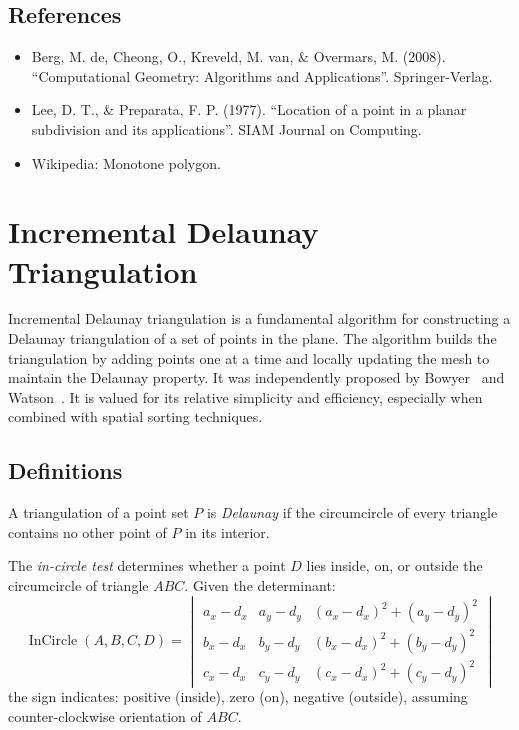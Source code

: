\subsection{References}

\begin{itemize}
\item Berg, M. de, Cheong, O., Kreveld, M. van, \& Overmars, M. (2008). ``Computational Geometry: Algorithms and Applications''. Springer-Verlag.
\item Lee, D. T., \& Preparata, F. P. (1977). ``Location of a point in a planar subdivision and its applications''. SIAM Journal on Computing.
\item Wikipedia: Monotone polygon.
\end{itemize}


\section{Incremental Delaunay Triangulation}
\label{sec:incremental_delaunay}

Incremental Delaunay triangulation is a fundamental algorithm for constructing a Delaunay triangulation of a set of points in the plane. The algorithm builds the triangulation by adding points one at a time and locally updating the mesh to maintain the Delaunay property. It was independently proposed by Bowyer~\cite{bowyer1981} and Watson~\cite{watson1981}. It is valued for its relative simplicity and efficiency, especially when combined with spatial sorting techniques.

\subsection{Definitions}

\begin{definition}\label{def:delaunay_property}
A triangulation of a point set $P$ is \emph{Delaunay} if the circumcircle of every triangle contains no other point of $P$ in its interior.
\end{definition}

\begin{definition}\label{def:incircle_test}
The \emph{in-circle test} determines whether a point $D$ lies inside, on, or outside the circumcircle of triangle $ABC$. Given the determinant:
\[
\operatorname{InCircle}(A,B,C,D) = \begin{vmatrix}
a_x - d_x & a_y - d_y & (a_x - d_x)^2 + (a_y - d_y)^2 \\
b_x - d_x & b_y - d_y & (b_x - d_x)^2 + (b_y - d_y)^2 \\
c_x - d_x & c_y - d_y & (c_x - d_x)^2 + (c_y - d_y)^2
\end{vmatrix}
\]
the sign indicates: positive (inside), zero (on), negative (outside), assuming counter-clockwise orientation of $ABC$.
\end{definition}


